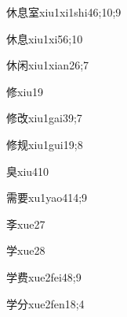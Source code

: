 \begin{verbete}{休息室}{xiu1xi1shi4}{6;10;9}
\end{verbete}

\begin{verbete}{休息}{xiu1xi5}{6;10}
\end{verbete}

\begin{verbete}{休闲}{xiu1xian2}{6;7}
\end{verbete}

\begin{verbete}{修}{xiu1}{9}
\end{verbete}

\begin{verbete}{修改}{xiu1gai3}{9;7}
\end{verbete}

\begin{verbete}{修规}{xiu1gui1}{9;8}
\end{verbete}

\begin{verbete}{臭}{xiu4}{10}
\end{verbete}

\begin{verbete}{需要}{xu1yao4}{14;9}
\end{verbete}

\begin{verbete}{斈}{xue2}{7}
\end{verbete}

\begin{verbete}{学}{xue2}{8}
\end{verbete}

\begin{verbete}{学费}{xue2fei4}{8;9}
\end{verbete}

\begin{verbete}{学分}{xue2fen1}{8;4}
\end{verbete}

